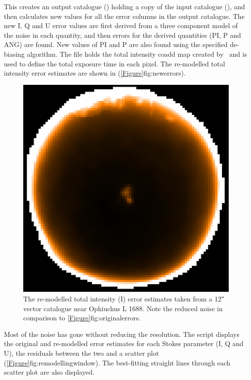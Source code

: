 \begin{terminalv}
\end{terminalv}

This  creates an output catalogue () holding a copy of the input catalogue (), and then calculates new values for all the error columns in the output catalogue. The new I, Q and U error values are first derived from a three component model of the noise in each quantity, and then errors for the derived quantities (PI, P and ANG) are found. New values of PI and P are also found using the specified de-biasing algorithm. The file  holds the total intensity coadd map created by \poltwomap\ and is used to define the total exposure time in each pixel. The re-modelled total intensity error estimates are shown in (\cref{Figure}{fig:newerrors}{}).

\begin{figure}[ht!]
\begin{center}
\includegraphics[width=0.46\linewidth]{sc22-ophl1688-pol2-noise-remod-1.png}
\caption [Remodelled Error Estimates in POL-2 Vector Catalogue for Oph L1688]{
  The re-modelled total intensity (I) error estimates taken from a 12\si{\arcsecond} vector catalogue near Ophiuchus L 1688. Note the reduced noise in comparison to \cref{Figure}{fig:originalerrors}{}.
\label{fig:newerrors}
}
\end{center}
\end{figure}

Most of the noise has gone without reducing the resolution. The script displays the original and re-modelled error estimates for each Stokes parameter (I, Q and U), the residuals between the two and a scatter plot (\cref{Figure}{fig:remodellingwindow}{}). The best-fitting straight lines through each scatter plot are also displayed.

